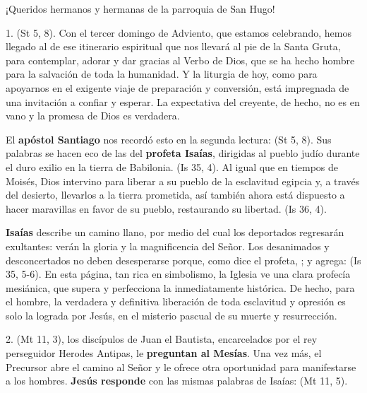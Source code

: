 				\begin{body}
					¡Queridos hermanos y hermanas de la parroquia de San Hugo!
					
					1.  (St 5, 8). Con el tercer domingo de Adviento, que estamos celebrando, hemos llegado al  de ese itinerario espiritual que nos llevará al pie de la Santa Gruta, para contemplar, adorar y dar gracias al Verbo de Dios, que se ha hecho hombre para la salvación de toda la humanidad. Y la liturgia de hoy, como para apoyarnos en el exigente viaje de preparación y conversión, está impregnada de una invitación a confiar y esperar. La expectativa del creyente, de hecho, no es en vano y la promesa de Dios es verdadera.
					
					El \textbf{apóstol Santiago} nos recordó esto en la segunda lectura:  (St 5, 8). Sus palabras se hacen eco de las del \textbf{profeta Isaías}, dirigidas al pueblo judío durante el duro exilio en la tierra de Babilonia.  (Is 35, 4). Al igual que en tiempos de Moisés, Dios intervino para liberar a su pueblo de la esclavitud egipcia y, a través del desierto, llevarlos a la tierra prometida, así también ahora está dispuesto a hacer maravillas en favor de su pueblo, restaurando su libertad.  (Is 36, 4).
					
					\textbf{Isaías} describe un camino llano, por medio del cual los deportados regresarán exultantes: verán la gloria y la magnificencia del Señor. Los desanimados y desconcertados no deben desesperarse porque, como dice el profeta, ; y agrega:  (Is 35, 5-6). En esta página, tan rica en simbolismo, la Iglesia ve una clara profecía mesiánica, que supera y perfecciona la inmediatamente histórica. De hecho, para el hombre, la verdadera y definitiva liberación de toda esclavitud y opresión es solo la lograda por Jesús, en el misterio pascual de su muerte y resurrección.
					
					2.  (Mt 11, 3), los discípulos de Juan el Bautista, encarcelados por el rey perseguidor Herodes Antipas, le \textbf{preguntan al Mesías}.  Una vez más, el Precursor abre el camino al Señor y le ofrece otra oportunidad para manifestarse a los hombres. \textbf{Jesús responde} con las mismas palabras de Isaías:  (Mt 11, 5).
					

\end{body}
